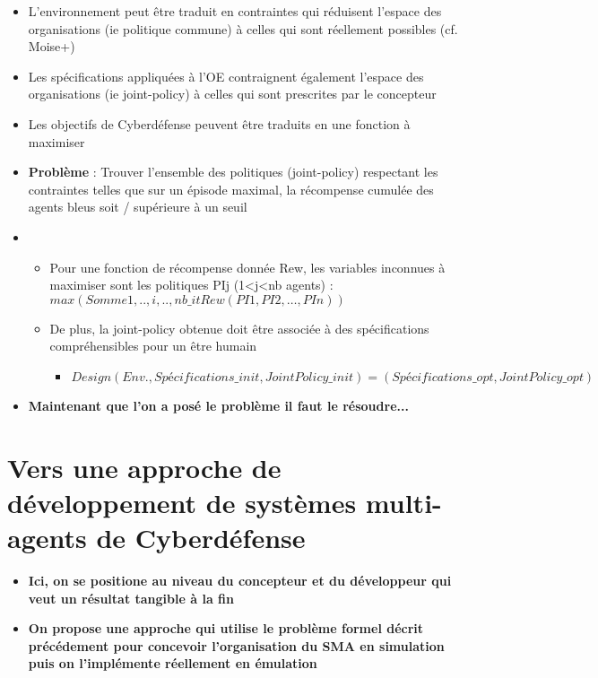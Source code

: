 \begin{itemize}
    \item L'environnement peut être traduit en contraintes qui réduisent l'espace des organisations (ie politique commune) à celles qui sont réellement possibles (cf. Moise+)
    \item Les spécifications appliquées à l'OE contraignent également l'espace des organisations (ie joint-policy) à celles qui sont prescrites par le concepteur
    \item Les objectifs de Cyberdéfense peuvent être traduits en une fonction à maximiser
    \item \textbf{Problème} : Trouver l'ensemble des politiques (joint-policy) respectant les contraintes telles que sur un épisode maximal, la récompense cumulée des agents bleus soit / supérieure à un seuil
    \item \begin{itemize}
              \item Pour une fonction de récompense donnée Rew, les variables inconnues à maximiser sont les politiques PIj (1<j<nb agents) :
                    $max (Somme{1, .., i, .., nb\_it} Rew(PI1, PI2, …, PIn))$
              \item De plus, la joint-policy obtenue doit être associée à des spécifications compréhensibles pour un être humain
                    \begin{itemize}
                        \item $Design(Env., Spécifications\_init, JointPolicy\_init) = (Spécifications\_opt, JointPolicy\_opt)$
                    \end{itemize}
          \end{itemize}
    \item \textbf{Maintenant que l'on a posé le problème il faut le résoudre...}
\end{itemize}

\section{Vers une approche de développement de systèmes multi-agents de Cyberdéfense}\label{sec:cybSMAda}

\begin{itemize}
    \item \textbf{Ici, on se positione au niveau du concepteur et du développeur qui veut un résultat tangible à la fin}
    \item \textbf{On propose une approche qui utilise le problème formel décrit précédement pour concevoir l'organisation du SMA en simulation puis on l'implémente réellement en émulation}
\end{itemize}

